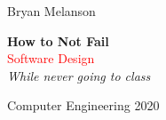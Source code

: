 \documentclass[11pt]{article}
\newcommand*{\plogo}{\fbox{$\mathcal{BM}$}}
\begin{document}
 
        
    \begin{titlepage}
    
        \raggedleft
        
        \vspace*{\baselineskip}
        
        {\Large Bryan Melanson}
        
        \vspace*{0.167\textheight}
        
        \textbf{\LARGE How to Not Fail}\\[\baselineskip]
        
        {\textcolor{Red}{\Huge Software Design}}\\[\baselineskip]
        
        {\Large \textit{While never going to class}}
        
        \vfill
        
        {\large Computer Engineering 2020 ~~\plogo}
        
        \vspace*{3\baselineskip}
    
    \end{titlepage}

    \pagebreak
    
    
\end{document}
